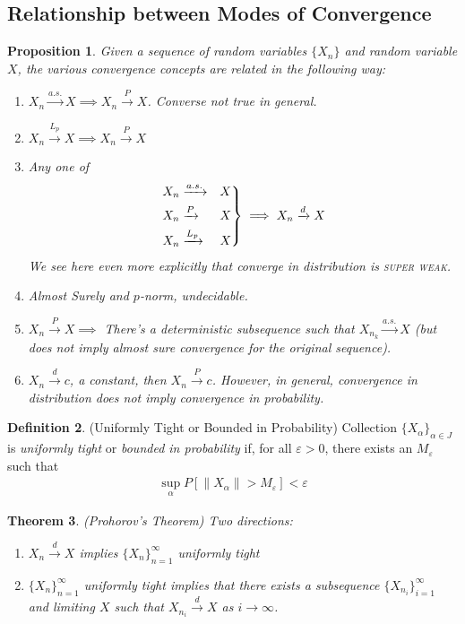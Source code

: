\documentclass[12pt]{article}
\theoremstyle{plain}
\newtheorem{thm}{Theorem}[section]
\newtheorem{prop}[thm]{Proposition}
\theoremstyle{definition}
\newtheorem{defn}[thm]{Definition}
\theoremstyle{remark}
\newcommand{\ra}{\rightarrow}
\newenvironment{rcases}
  {\left.\begin{aligned}}
  {\end{aligned}\right\rbrace}
\newcommand{\asto}{\xrightarrow{a.s.}}
\newcommand{\pto}{\xrightarrow{P}}
\newcommand{\dto}{\xrightarrow{d}}
\newcommand{\Lpto}{\xrightarrow{L_p}}
\newcommand{\ninf}{_{n=1}^\infty}
\begin{document}
\clearpage
\subsection{Relationship between Modes of Convergence}

\begin{prop}
\label{prop:modes}
Given a sequence of random variables $\{X_n\}$ and random variable $X$,
the various convergence concepts are related in the following way:
\begin{enumerate}
  \item $X_n\asto X \implies X_n\pto X$. Converse not true in general.
  \item $X_n\Lpto X \implies X_n\pto X$
  \item Any one of
    \begin{align*}
      \begin{rcases}
        X_n&\asto &X \\
        X_n&\pto &X \\
        X_n&\Lpto &X
      \end{rcases}
      \implies X_n\dto X
    \end{align*}
    We see here even more explicitly that converge in distribution is
    \textsc{super weak}.
  \item Almost Surely and $p$-norm, undecidable.
  \item $X_n\pto X \implies$ There's a deterministic subsequence such
    that $X_{n_k}\asto X$ (but does not imply almost sure convergence
    for the original sequence).

  \item $X_n\dto c$, a constant, then $X_n\pto c$. However, in general,
    convergence in distribution does not imply convergence in
    probability.
\end{enumerate}
\end{prop}

\begin{defn}(Uniformly Tight or Bounded in Probability)
Collection $\{X_\alpha\}_{\alpha\in J}$ is \emph{uniformly tight}
or \emph{bounded in probability}
if, for all $\varepsilon>0$, there exists an $M_\varepsilon$ such that
\begin{align*}
  \sup_\alpha P[\lVert X_\alpha\rVert >M_\varepsilon] <\varepsilon
\end{align*}
\end{defn}

\begin{thm}\emph{(Prohorov's Theorem)}
Two directions:
\begin{enumerate}[label=\emph{(\roman*)}]
  \item $X_n\dto X$ implies $\{X_n\}\ninf$ uniformly tight
  \item $\{X_n\}\ninf$ uniformly tight implies that there exists a
    subsequence $\{X_{n_i}\}_{i=1}^\infty$ and limiting $X$ such that
    $X_{n_i}\dto X$ as $i\ra\infty$.
\end{enumerate}
\end{thm}
\end{document}
